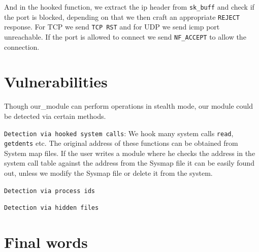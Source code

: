 \documentclass[10pt, letterpaper]{scrartcl}
\begin{document}
And in the hooked function, we extract the ip header from \texttt{sk\_buff} and check if the port is blocked, depending on that we then craft an appropriate \texttt{REJECT} response. For TCP we send \texttt{TCP RST} and for UDP we send icmp port unreachable. If the port is allowed to connect we send \texttt{NF\_ACCEPT} to allow the connection.

\section{Vulnerabilities}
Though our\_module can perform operations in stealth mode, our module could be detected via certain methods. 

\texttt{Detection via hooked system calls}: We hook many system calls \texttt{read}, \texttt{getdents} etc. 
The original address of these functions can be obtained from System map files. 
If the user writes a module where he checks the address in the system call table against the address from the Sysmap file it can be easily found out, unless we modify the Sysmap file or delete it from the system. 

\texttt{Detection via process ids}

\texttt{Detection via hidden files}

\section{Final words}
\end{document}
